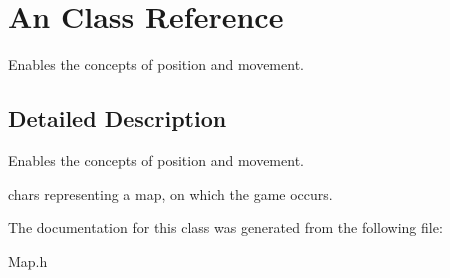 \hypertarget{class_an}{}\section{An Class Reference}
\label{class_an}


Enables the concepts of position and movement.  




\subsection{Detailed Description}
Enables the concepts of position and movement. 

chars representing a map, on which the game occurs. 

The documentation for this class was generated from the following file\+:\begin{DoxyCompactItemize}
\item 
Map.\+h\end{DoxyCompactItemize}
